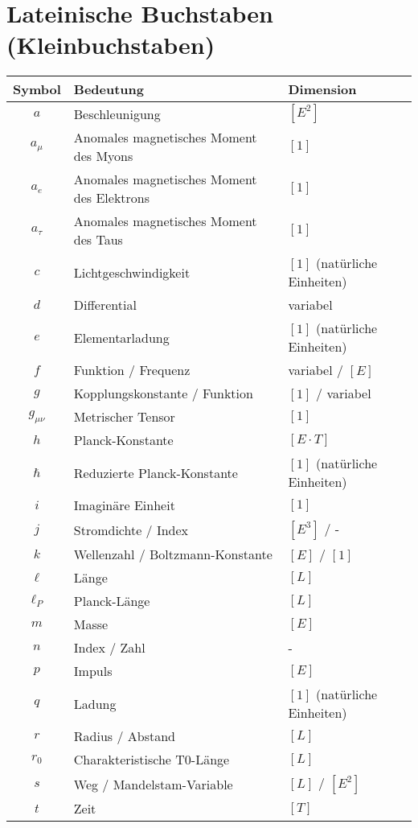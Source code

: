 \documentclass[12pt,a4paper]{report}
\begin{document}
	\section{Lateinische Buchstaben (Kleinbuchstaben)}
	\label{sec:latin_small}
	
	\begin{longtable}{|c|l|l|}
		\hline
		\textbf{Symbol} & \textbf{Bedeutung} & \textbf{Dimension} \\
		\hline
		$a$ & Beschleunigung & $[E^2]$ \\
		$a_\mu$ & Anomales magnetisches Moment des Myons & $[1]$ \\
		$a_e$ & Anomales magnetisches Moment des Elektrons & $[1]$ \\
		$a_\tau$ & Anomales magnetisches Moment des Taus & $[1]$ \\
		$c$ & Lichtgeschwindigkeit & $[1]$ (natürliche Einheiten) \\
		$d$ & Differential & variabel \\
		$e$ & Elementarladung & $[1]$ (natürliche Einheiten) \\
		$f$ & Funktion / Frequenz & variabel / $[E]$ \\
		$g$ & Kopplungskonstante / Funktion & $[1]$ / variabel \\
		$g_{\mu\nu}$ & Metrischer Tensor & $[1]$ \\
		$h$ & Planck-Konstante & $[E \cdot T]$ \\
		$\hbar$ & Reduzierte Planck-Konstante & $[1]$ (natürliche Einheiten) \\
		$i$ & Imaginäre Einheit & $[1]$ \\
		$j$ & Stromdichte / Index & $[E^3]$ / - \\
		$k$ & Wellenzahl / Boltzmann-Konstante & $[E]$ / $[1]$ \\
		$\ell$ & Länge & $[L]$ \\
		$\ell_P$ & Planck-Länge & $[L]$ \\
		$m$ & Masse & $[E]$ \\
		$n$ & Index / Zahl & - \\
		$p$ & Impuls & $[E]$ \\
		$q$ & Ladung & $[1]$ (natürliche Einheiten) \\
		$r$ & Radius / Abstand & $[L]$ \\
		$r_0$ & Charakteristische T0-Länge & $[L]$ \\
		$s$ & Weg / Mandelstam-Variable & $[L]$ / $[E^2]$ \\
		$t$ & Zeit & $[T]$ \\

\end{longtable}
\end{document}
